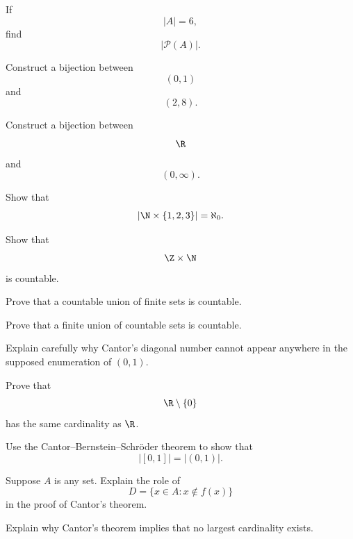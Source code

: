 \begin{exercise}[2]
If
\[ |A|=6, \]
find
\[ |\mathcal P(A)|. \]
\end{exercise}

\begin{exercise}[2]
Construct a bijection between
\[ (0,1) \]
and
\[ (2,8). \]
\end{exercise}

\begin{exercise}[2]
Construct a bijection between
\[ \R \]
and
\[ (0,\infty). \]
\end{exercise}

\begin{exercise}[3]
Show that
\[ |\N\times\{1,2,3\}|=\aleph_0. \]
\end{exercise}

\begin{exercise}[3]
Show that
\[ \Z\times\N \]
is countable.
\end{exercise}

\begin{exercise}[3]
Prove that a countable union of finite sets is countable.
\end{exercise}

\begin{exercise}[3]
Prove that a finite union of countable sets is countable.
\end{exercise}

\begin{exercise}[3]
Explain carefully why Cantor's diagonal number cannot appear anywhere in the
supposed enumeration of \((0,1)\).
\end{exercise}

\begin{exercise}[3]
Prove that
\[ \R\setminus\{0\} \]
has the same cardinality as \(\R\).
\end{exercise}

\begin{exercise}[3]
Use the Cantor--Bernstein--Schröder theorem to show that
\[ |[0,1]|=|(0,1)|. \]
\end{exercise}

\begin{exercise}[3]
Suppose \(A\) is any set. Explain the role of
\[ D=\{x\in A:x\notin f(x)\} \]
in the proof of Cantor's theorem.
\end{exercise}

\begin{exercise}[3]
Explain why Cantor's theorem implies that no largest cardinality exists.
\end{exercise}

